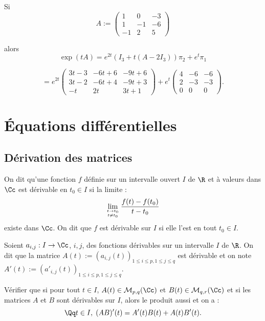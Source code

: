 \documentclass[class=report,crop=false]{standalone}
\begin{document}
\begin{exemple}
Si \[ A:=\left(\begin{array}{ccc}
1 & 0 & -3\\
1&-1&-6\\
-1&2&5
\end{array}\right)\]

alors \[\exp({tA}) = e^{2t}(I_3 + t(A-2I_3))\pi_2 + e^t \pi_1\]

\[ = e^{2t} \left(\begin{array}{ccc}
3t-3 & -6t+6 & -9t+6\\
3t-2&-6t+4&-9t+3\\
-t&2t&3t+1
\end{array}\right) + e^t  \left(\begin{array}{ccc}
4 & -6& -6\\
2&-3&-3\\
0&0&0
\end{array}\right) .\]
\end{exemple}


\section{Équations différentielles}

\subsection{Dérivation des matrices}

On dit qu'une fonction $f$ définie sur un intervalle ouvert $I$ de $\R$ et à valeurs dans $\Cc$ est dérivable en $t_0 \in I$ si la limite :
\[\lim_{t \to t_0 \atop t \neq t_0}\frac{f(t)-f(t_0)}{t-t_0}\]
existe dans $\Cc$. On dit que $f$ est dérivable sur $I$ si elle l'est en tout $t_0 \in I$. 

\begin{definition}
Soient $a_{i,j} : I \to \Cc$, $i,j$, des fonctions dérivables sur un intervalle $I$ de $\R$. On dit que la matrice $A(t) := (a_{i,j}(t))_{1\le i \le p, 1 \le j \le q}$ est dérivable et on note $A'(t) := (a'_{i,j}(t))_{1\le i \le p, 1 \le j \le q}$.
\end{definition}

\begin{exercicecours}
Vérifier que si pour tout $t \in I$, $A(t) \in \mathcal{M}_{p,q}(\Cc)$ et $B(t) \in \mathcal{M}_{q,r}(\Cc)$ et si les matrices $A$ et $B$ sont dérivables sur $I$, alors le produit aussi et on a :
\[\Qq t \in I ,\; (AB)'(t) = A'(t)B(t) + A(t) B'(t) . \]
\end{exercicecours}
\end{document}
